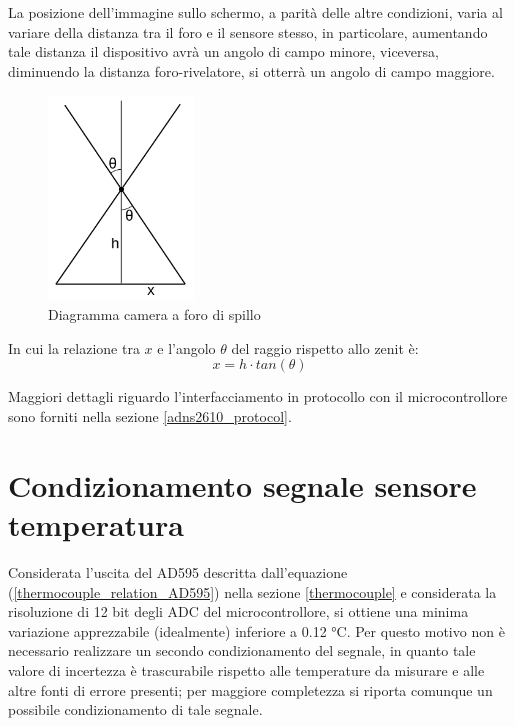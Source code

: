\documentclass[12pt]{article}
\begin{document}
    \noindent
    La posizione dell'immagine sullo schermo, a parità delle altre condizioni, varia al variare della distanza tra il foro e il sensore stesso, in particolare, aumentando tale distanza il dispositivo avrà un angolo di campo minore, viceversa, diminuendo la distanza foro-rivelatore, si otterrà un angolo di campo maggiore.
    
    \begin{figure}[h]
        \centering
        \includegraphics[width=110pt]{Draws/Pinhole_diagram}
        \caption{Diagramma camera a foro di spillo}
        \label{fig:pinhole_diagram}
    \end{figure}
    
    \noindent
    In cui la relazione tra $x$ e l'angolo $\theta$ del raggio rispetto allo zenit è:
    \begin{equation}\label{pinhole_angle_relation}
        x = h \cdot tan(\theta)
    \end{equation}
    
    \noindent
    Maggiori dettagli riguardo l'interfacciamento in protocollo con il microcontrollore sono forniti nella sezione \ref{adns2610_protocol}.
    
    
 
\section{Condizionamento segnale sensore temperatura}\label{conditioning}
    Considerata l'uscita del AD595 descritta dall'equazione (\ref{thermocouple_relation_AD595}) nella sezione \ref{thermocouple} e considerata la risoluzione di 12 bit degli ADC del microcontrollore, si ottiene una minima variazione apprezzabile (idealmente) inferiore a 0.12 °C. Per questo motivo non è necessario realizzare un secondo condizionamento del segnale, in quanto tale valore di incertezza è trascurabile rispetto alle temperature da misurare e alle altre fonti di errore presenti; per maggiore completezza si riporta comunque un possibile condizionamento di tale segnale. \\
    
\end{document}
